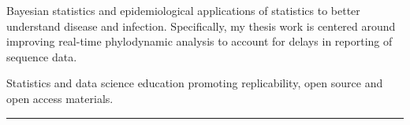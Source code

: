 \documentclass{article}
\begin{document}
	
	
	\begin{description}
		\vspace{-2mm}
		\item[Research Interests]\hspace*{.1in}
		
		Bayesian statistics and epidemiological applications of statistics to better understand disease and infection. Specifically, my thesis work is centered around improving real-time phylodynamic analysis to account for delays in reporting of sequence data.
		
		Statistics and data science education promoting replicability, open source and open access materials.
		
	\end{description}
	\vspace{-2mm}
	\rule{\linewidth}{1pt}
	
	
	
\end{document}
